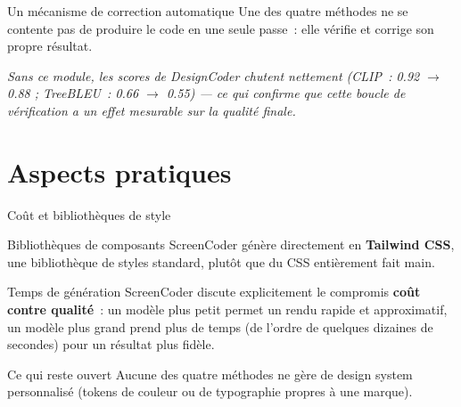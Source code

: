 \documentclass[11pt]{beamer}
\begin{document}
\begin{frame}{Un mécanisme de correction automatique}
Une des quatre méthodes ne se contente pas de produire le code en une seule passe~: elle vérifie et corrige son propre résultat.
\begin{center}
\end{center}
\small\textit{Sans ce module, les scores de DesignCoder chutent nettement (CLIP~: 0.92 $\to$ 0.88 ; TreeBLEU~: 0.66 $\to$ 0.55) --- ce qui confirme que cette boucle de vérification a un effet mesurable sur la qualité finale.}
\end{frame}

\section{Aspects pratiques}

\begin{frame}{Coût et bibliothèques de style}
\begin{block}{Bibliothèques de composants}
ScreenCoder génère directement en \textbf{Tailwind CSS}, une bibliothèque de styles standard, plutôt que du CSS entièrement fait main.
\end{block}
\begin{block}{Temps de génération}
ScreenCoder discute explicitement le compromis \textbf{coût contre qualité}~: un modèle plus petit permet un rendu rapide et approximatif, un modèle plus grand prend plus de temps (de l'ordre de quelques dizaines de secondes) pour un résultat plus fidèle.
\end{block}
\begin{alertblock}{Ce qui reste ouvert}
Aucune des quatre méthodes ne gère de design system personnalisé (tokens de couleur ou de typographie propres à une marque).
\end{alertblock}
\end{frame}
\end{document}
